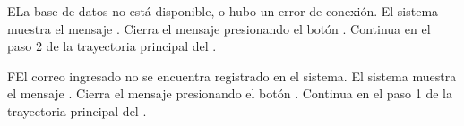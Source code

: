 
\begin{UCtrayectoriaA}{E}{La base de datos no está disponible, o hubo un error de conexión.}
    \UCpaso El sistema muestra el mensaje .
    \UCpaso[\UCactor] Cierra el mensaje presionando el botón .
    \UCpaso Continua en el paso 2 de la trayectoria principal del .
\end{UCtrayectoriaA}

\begin{UCtrayectoriaA}{F}{El correo ingresado no se encuentra registrado en el sistema.}
    \UCpaso El sistema muestra el mensaje .
    \UCpaso[\UCactor] Cierra el mensaje presionando el botón .
    \UCpaso Continua en el paso 1 de la trayectoria principal del .
\end{UCtrayectoriaA}



